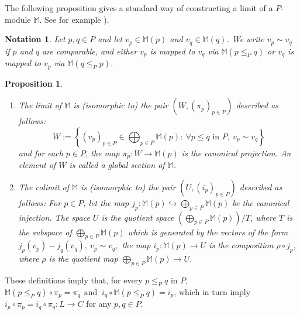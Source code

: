 \documentclass[11pt]{article}
\theoremstyle{plain}%
\newtheorem{proposition}{Proposition}[section]
\newtheorem{notation}{Notation}[section]
\newcommand{\M}{\mathbb{M}}
\newcommand{\Pb}{P}
\begin{document}
The following proposition gives a standard way of constructing a limit of a $P$-module $\M$. See for example \cite{DKM22,kim2018generalized}).

\begin{notation}\label{not:sim}
Let $p,q\in P$ and let $v_{p}\in \M(p)$ and $v_{q}\in \M(q)$. We write $v_p\sim v_q$ if $p$ and $q$ are comparable, and either $v_p$ is mapped to $v_q$ via $\M(p\leq_P q)$ or $v_q$ is mapped to $v_p$ via $\M(q\leq_P p)$.
\end{notation}

\begin{proposition}\label{prop:alternate-limit} 
	\begin{enumerate}[label=(\roman*)]
		\item \label{item:limit}The limit of $\M$ is (isomorphic to) the pair $\left(W,(\pi_p)_{p\in P}\right)$ described as follows: 
		\begin{equation}\label{eq:limit}
		    W:=\left\{(v_p)_{p\in P}\in \bigoplus_{p\in P} \M(p):\ \forall p\leq q \mbox{ in } P,\ v_{p}\sim v_{q} \right\}
		\end{equation}
		and for each $p\in P$, the map $\pi_p:W\rightarrow \M(p)$ is the canonical projection. 
		An element of $W$ is called a \emph{global section} of $\M$.
		\item The colimit of $\M$ is (isomorphic to) the pair $\left(U, (i_p)_{p\in \Pb}\right)$ described as follows: For $p\in \Pb$, let the map $j_p:\M(p)\hookrightarrow \bigoplus_{p\in \Pb}\M(p)$ be the canonical injection. The space $U$ is the quotient  space $\left(\bigoplus_{p\in \Pb}\M(p)\right)/T$, where $T$ is the subspace of $\bigoplus_{p\in \Pb} \M(p)$ which is generated by the vectors of the form  $j_p(v_p)-j_q(v_q), \ v_p\sim v_{q},$ the map $i_p:\M(p)\rightarrow U$ is the composition $\rho\circ j_p$, where $\rho$ is the quotient map $\bigoplus_{p\in \Pb} \M(p)\rightarrow U$.
		\label{item:colim}
	\end{enumerate}
\end{proposition} 

These definitions imply that, for every $p\leq_P q$ in $P$, $\M(p\leq_P q)\circ \pi_p =\pi_q\ \ \mbox{and }\  i_q\circ \M(p\leq_P q) =i_p$, which in turn imply $i_p \circ \pi_p=i_q \circ \pi_q:L\rightarrow C$ for any $p,q\in P$. 
\end{document}

